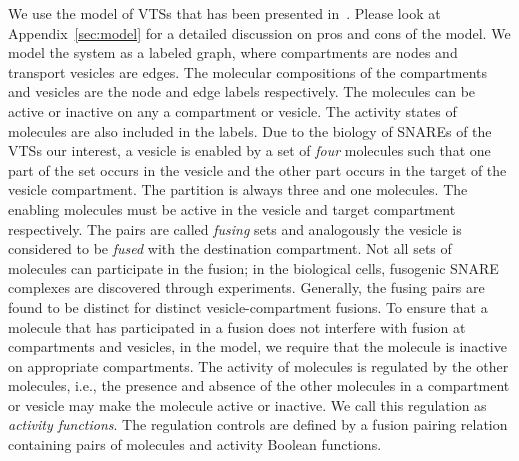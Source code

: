 We use the model of VTSs that has been presented
in~\cite{shukla2017discovering}.
%
Please look at Appendix~\ref{sec:model} for a detailed discussion on
pros and cons of the model.
%
We model the system as a labeled graph, where compartments are nodes
and transport vesicles are edges.
%
The molecular compositions of the compartments and vesicles are the
node and edge labels respectively.
%
The molecules can be active or inactive on any a compartment or
vesicle.
%
The activity states of molecules are also included in the labels.
%
Due to the biology of SNAREs of the VTSs our interest, a vesicle is enabled
by a set of {\em four} molecules such that one part of the set occurs in the
vesicle and the other part occurs in the target of the vesicle compartment.
%
The partition is always three and one molecules.
%
%
%
%
%
The enabling molecules must be active in the vesicle
and target compartment respectively.
%
The pairs are called {\em fusing} sets and analogously
the vesicle is considered to be {\em fused} with the
destination compartment.
%
Not all sets of molecules can participate in the fusion; in the
biological cells, fusogenic SNARE complexes are discovered through
experiments.
%
%
Generally, the fusing pairs are found to be distinct for distinct vesicle-compartment fusions.
%
To ensure that a molecule that has participated in a fusion does not
interfere with fusion at compartments and vesicles, in the model, we
require that the molecule is inactive on appropriate compartments.
%
The activity of molecules is regulated by the other molecules, i.e.,
the presence and absence of the other molecules in a compartment or
vesicle may make the molecule active or inactive.
%
We call this regulation as {\em activity functions}.
%
%
%
%
The regulation controls are defined by a fusion pairing relation
containing pairs of molecules and activity
Boolean functions.

